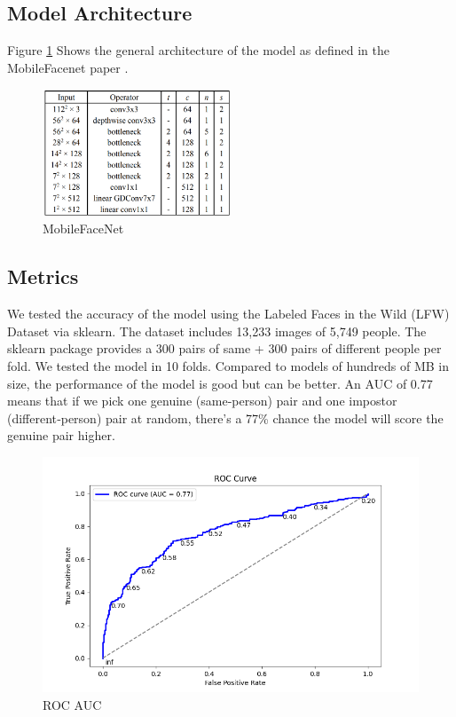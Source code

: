 \subsection{Model Architecture}
	Figure \ref{fig:mfn_arch} Shows the general architecture of the model as defined in the MobileFacenet paper \cite{chen2018mobilefacenets}.
	 \begin{figure}[h] %
	 	\centering
	 	\includegraphics[width=0.5\textwidth]{figures/chapter4/mfn_arch.png} %
	 	\caption{MobileFaceNet}
	 	\label{fig:mfn_arch}
	 \end{figure}

\clearpage 
\subsection{Metrics}
We tested the accuracy of the model using the Labeled Faces in the Wild (LFW) Dataset via sklearn. The dataset includes 13,233 images of 5,749 people. The sklearn package provides a 300 pairs of same + 300 pairs of different people per fold. We tested the model in 10 folds.
Compared to models of hundreds of MB in size, the performance of the model is good but can be better. An AUC of 0.77 means that if we pick one genuine (same‐person) pair and one impostor (different‐person) pair at random, there’s a 77\% chance the model will score the genuine pair higher.
 \begin{figure}[h] %
	\centering
	\includegraphics[width=1\textwidth]{figures/chapter4/roc_curve.png} %
	\caption{ROC AUC}
	\label{fig:roc_curve}
\end{figure}

